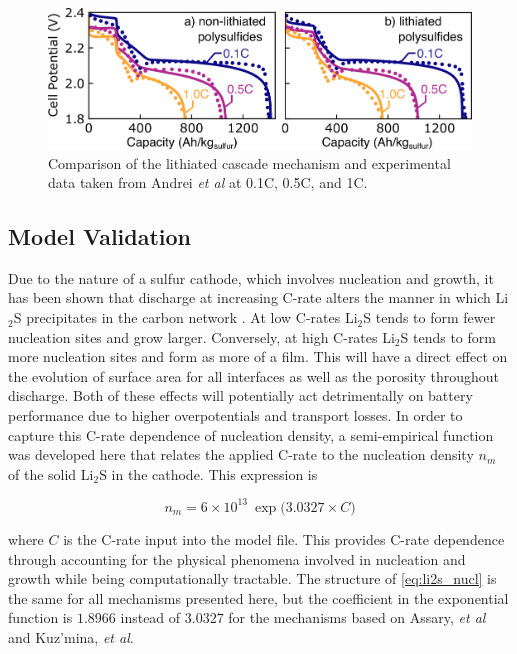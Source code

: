 \documentclass{elsarticle}
\begin{document}
\begin{center}
\begin{figure}[b]
    \centering
    \includegraphics[width=\textwidth]{Figures/Figure3_validation.png}
    \caption{Comparison of the lithiated cascade mechanism and experimental data taken from Andrei \textit{et al} \cite{ANDREI2018469} at 0.1C, 0.5C, and 1C.}
    \label{fig:lithiatedcascadevalidation}
\end{figure}
\end{center}

\subsection{Model Validation}
Due to the nature of a sulfur cathode, which involves nucleation and growth, it has been shown that discharge at increasing C-rate alters the manner in which Li$_2$S precipitates in the carbon network \cite{REN2016115}. At low C-rates Li$_2$S tends to form fewer nucleation sites and grow larger. Conversely, at high C-rates Li$_2$S tends to form more nucleation sites and form as more of a film. This will have a direct effect on the evolution of surface area for all interfaces as well as the porosity throughout discharge. Both of these effects will potentially act detrimentally on battery performance due to higher overpotentials and transport losses. In order to capture this C-rate dependence of nucleation density, a semi-empirical function was developed here that relates the applied C-rate to the nucleation density $n_m$ of the solid Li$_2$S in the cathode. This expression is 

\begin{equation}\label{eq:li2s_nucl}
    n_m = 6 \times 10^{13} ~ \exp \big( 3.0327 \times C \big)
\end{equation}

where $C$ is the C-rate input into the model file. This provides C-rate dependence through accounting for the physical phenomena involved in nucleation and growth while being computationally tractable. The structure of \ref{eq:li2s_nucl} is the same for all mechanisms presented here, but the coefficient in the exponential function is $1.8966$ instead of $3.0327$ for the mechanisms based on Assary, \textit{et al} and Kuz'mina, \textit{et al}. 
\end{document}
